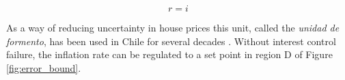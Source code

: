 \[
    r = i
\]

As a way of reducing uncertainty in house prices this unit, called the \textit{unidad de formento},
has been used in Chile for several decades \cite{shiller1998}. Without interest control failure, the
inflation rate can be regulated to a set point in region D of Figure \ref{fig:error_bound}. 














